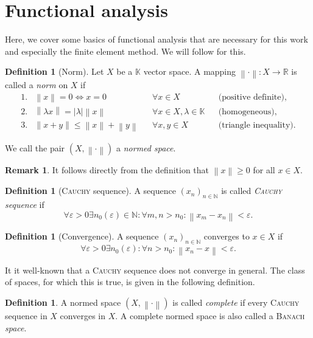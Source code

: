 \documentclass[12pt,a4paper,twoside, open=right]{scrreprt}
\theoremstyle{definition}
\newtheorem{rem}[auf]{Remark}
\newtheorem{defn}[auf]{Definition}
\theoremstyle{plain}
\newcommand{\abs}[1]{\left\vert #1\right\vert}
\newcommand{\rr}{\mathbb{R}}
\newcommand{\kk}{\mathbb{K}}
\newcommand{\nn}{\mathbb{N}}
\newcommand{\norm}[1]{\left\lVert#1\right\rVert}
\begin{document}
\section{Functional analysis}
\label{sec:funcana}
Here, we cover some basics of functional analysis that are necessary for this work and especially the finite element method. We will follow \cite{Ganesan2017} for this.
\begin{defn}[Norm]
    Let $X$ be a $\kk$ vector space. A mapping $\norm{\cdot}\colon X\to\rr$ is called a \emph{norm} on $X$ if 
    \begin{align}
        1. &\norm{x}=0 \Leftrightarrow x=0 &&\forall x\in X  &&\text{(positive definite)},\\
        2. &\norm{\lambda x}=\abs{\lambda}\norm{x} &&\forall x\in X,\lambda\in\kk &&\text{(homogeneous)},\\
        3. &\norm{x+y}\le\norm{x}+\norm{y}&&\forall x,y\in X &&\text{(triangle inequality)}.
    \end{align}

    We call the pair $(X,\norm{\cdot})$ a \emph{normed space}.
\end{defn}
\begin{rem}
    It follows directly from the definition that $\norm{x}\ge 0$ for all $ x\in X$.
\end{rem}
\begin{defn}[\textsc{Cauchy} sequence]
    A sequence $(x_n)_{n\in\nn}$ is called \emph{\textsc{Cauchy} sequence} if
    \begin{equation}
         \forall\varepsilon>0 \exists n_0(\varepsilon)\in\nn\colon \forall m,n>n_0\colon\norm{x_m-x_n}<\varepsilon.
    \end{equation}
\end{defn}
\begin{defn}[Convergence]
    A sequence $(x_n)_{n\in\nn}$ converges to $x\in X$ if 
    \begin{equation}
        \forall\varepsilon>0 \exists n_0(\varepsilon)\colon \forall n>n_0 \colon \norm{x_n -x}<\varepsilon.
    \end{equation}
\end{defn}
It it well-known that a \textsc{Cauchy} sequence does not converge in general. The class of spaces, for which this is true, is given in the following definition.
\begin{defn}
    A normed space $(X, \norm{\cdot})$ is called \emph{complete} if every \textsc{Cauchy} sequence in $X$ converges in $X$. A complete normed space is also called a \textsc{Banach} \emph{space}.
\end{defn}
\end{document}
